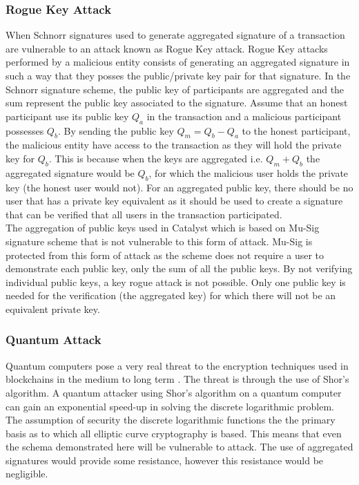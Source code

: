 \subsubsection{Rogue Key Attack}

When Schnorr signatures used to generate aggregated signature of a transaction are vulnerable to an attack known as Rogue Key attack. Rogue Key attacks performed by a malicious entity consists of generating an aggregated signature in such a way that they posses the public/private key pair for that signature. In the Schnorr signature scheme, the public key of participants are aggregated and the sum represent the public key associated to the signature. Assume that an honest participant use its public key $Q_a$ in the transaction and a malicious participant possesses $Q_b$. By sending the public key $Q_m = Q_b -  Q_a$ to the honest participant, the malicious entity have access to the transaction as they will hold the private key for $Q_b$. This is because when the keys are aggregated i.e. $Q_m + Q_b$ the aggregated signature would be $Q_b$, for which the malicious user holds the private key (the honest user would not). For an aggregated public key, there should be no user that has a private key equivalent as it should be used to create a signature that can be verified that all users in the transaction participated. \\ 	

The aggregation of public keys used in Catalyst which is based on Mu-Sig \cite{musig} signature scheme that is not vulnerable to this form of attack. Mu-Sig is protected from this form of attack as the scheme does not require a user to demonstrate each public key, only the sum of all the public keys. By not verifying individual public keys, a key rogue attack is not possible. Only one public key is needed for the verification (the aggregated key) for which there will not be an equivalent private key.

\subsubsection{Quantum Attack}

Quantum computers pose a very real threat to the encryption techniques used in blockchains in the medium to long term \cite{agarwal} \cite{kearney}. The threat is through the use of Shor's algorithm. A quantum attacker using Shor's algorithm on a quantum computer can gain an exponential speed-up in solving the discrete logarithmic problem. The assumption of security the discrete logarithmic functions the the primary basis as to which all elliptic curve cryptography is based. This means that even the schema demonstrated here will be vulnerable to attack. The use of aggregated signatures would provide some resistance, however this resistance would be negligible. \\

